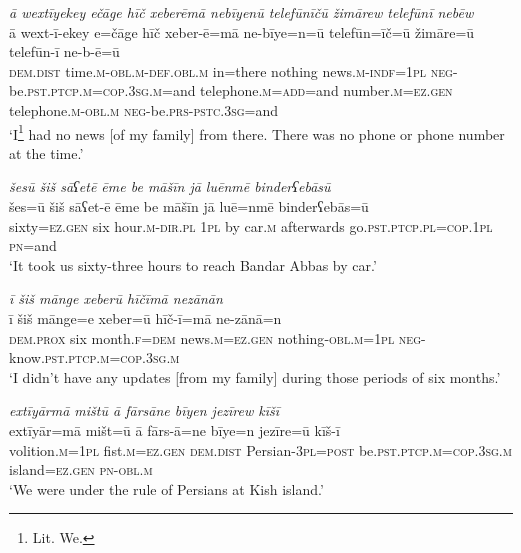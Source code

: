 \ea \label{ŽM.32}
\textit{ā wextīyekey ečāge hīč xeberēmā nebīyenū telefūnīčū žimārew telefūnī nebēw} \\ 
\gll ā wext-ī-ekey e=čāge hīč xeber-ē=mā ne-bīye=n=ū telefūn=īč=ū žimāre=ū telefūn-ī ne-b-ē=ū \\ 
 \textsc{dem.dist} time\textsc{.m}\textsc{-obl}\textsc{.m}\textsc{-def}\textsc{.obl}\textsc{.m} in=there nothing news\textsc{.m}\textsc{-indf}\textsc{=\textsc{1pl}} \textsc{neg-}be\textsc{.pst}\textsc{.ptcp}\textsc{.m}\textsc{=cop}\textsc{.3sg}\textsc{.m}=and telephone\textsc{.m}\textsc{=add}=and number\textsc{.m}\textsc{=ez.gen} telephone\textsc{.m}\textsc{-obl}\textsc{.m} \textsc{neg-}be\textsc{.prs}\textsc{-pstc}\textsc{.3sg}=and \\ 
\glt `I\footnote{Lit. We.}  had no news [of my family] from there. There was no phone or phone number at the time.'
\z 
 
\ea \label{ŽM.33}
\textit{šesū šiš sāʕetē ēme be māšīn jā luēnmē binderʕebāsū} \\ 
\gll šes=ū šiš sāʕet-ē ēme be māšīn jā luē=nmē binderʕebās=ū \\ 
 sixty\textsc{=ez.gen} six hour\textsc{.m}\textsc{-dir}\textsc{.pl} \textsc{1pl} by car\textsc{.m} afterwards go\textsc{.pst}\textsc{.ptcp}\textsc{.pl}\textsc{=cop}\textsc{.\textsc{1pl}} \textsc{pn}=and \\ 
\glt `It took us sixty-three hours to reach Bandar Abbas by car.'
\z 
 
\ea \label{ŽM.36}
\textit{ī šiš mānge xeberū hīčīmā nezānān} \\ 
\gll ī šiš mānge=e xeber=ū hīč-ī=mā ne-zānā=n \\ 
 \textsc{dem.prox} six month\textsc{.f}\textsc{=dem} news\textsc{.m}\textsc{=ez.gen} nothing\textsc{-obl}\textsc{.m}\textsc{=\textsc{1pl}} \textsc{neg-}know\textsc{.pst}\textsc{.ptcp}\textsc{.m}\textsc{=cop}\textsc{.3sg}\textsc{.m} \\ 
\glt `I didn’t have any updates [from my family] during those periods of six months.'
\z 
 
\ea \label{ŽM.38}
\textit{extīyārmā mištū ā fārsāne bīyen jezīrew kīšī} \\ 
\gll extīyār=mā mišt=ū ā fārs-ā=ne bīye=n jezīre=ū kīš-ī \\ 
 volition\textsc{.m}\textsc{=\textsc{1pl}} fist\textsc{.m}\textsc{=ez.gen} \textsc{dem.dist} Persian\textsc{-3pl}\textsc{=\textsc{post}} be\textsc{.pst}\textsc{.ptcp}\textsc{.m}\textsc{=cop}\textsc{.3sg}\textsc{.m} island\textsc{=ez.gen} \textsc{pn}\textsc{-obl}\textsc{.m} \\ 
\glt `We were under the rule of Persians at Kish island.'
\z 
 
